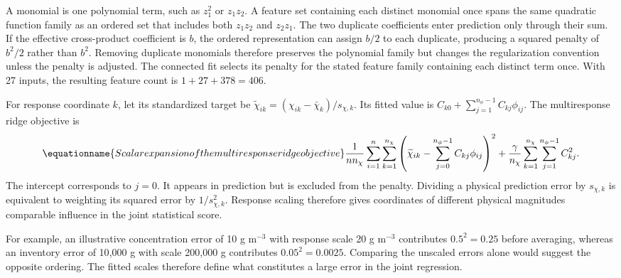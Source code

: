 A monomial is one polynomial term, such as $z_1^2$ or $z_1z_2$. A feature set containing each distinct monomial once spans the same quadratic function family as an ordered set that includes both $z_1z_2$ and $z_2z_1$. The two duplicate coefficients enter prediction only through their sum. If the effective cross-product coefficient is $b$, the ordered representation can assign $b/2$ to each duplicate, producing a squared penalty of $b^2/2$ rather than $b^2$. Removing duplicate monomials therefore preserves the polynomial family but changes the regularization convention unless the penalty is adjusted. The connected fit selects its penalty for the stated feature family containing each distinct term once. With 27 inputs, the resulting feature count is $1+27+378=406$.

For response coordinate $k$, let its standardized target be $\widetilde\chi_{ik}=(\chi_{ik}-\bar\chi_k)/s_{\chi,k}$. Its fitted value is $C_{k0}+\sum_{j=1}^{n_\phi-1}C_{kj}\phi_{ij}$. The multiresponse ridge objective is
\begin{equation}
\equationname{Scalar expansion of the multiresponse ridge objective}
\frac1{n n_\chi}\sum_{i=1}^{n}\sum_{k=1}^{n_\chi}
\left(\widetilde\chi_{ik}-\sum_{j=0}^{n_\phi-1}C_{kj}\phi_{ij}\right)^2
+\frac{\gamma}{n_\chi}\sum_{k=1}^{n_\chi}\sum_{j=1}^{n_\phi-1}C_{kj}^2.
\end{equation}
The intercept corresponds to $j=0$. It appears in prediction but is excluded from the penalty. Dividing a physical prediction error by $s_{\chi,k}$ is equivalent to weighting its squared error by $1/s_{\chi,k}^2$. Response scaling therefore gives coordinates of different physical magnitudes comparable influence in the joint statistical score.

For example, an illustrative concentration error of 10 g m$^{-3}$ with response scale 20 g m$^{-3}$ contributes $0.5^2=0.25$ before averaging, whereas an inventory error of 10{,}000 g with scale 200{,}000 g contributes $0.05^2=0.0025$. Comparing the unscaled errors alone would suggest the opposite ordering. The fitted scales therefore define what constitutes a large error in the joint regression.

